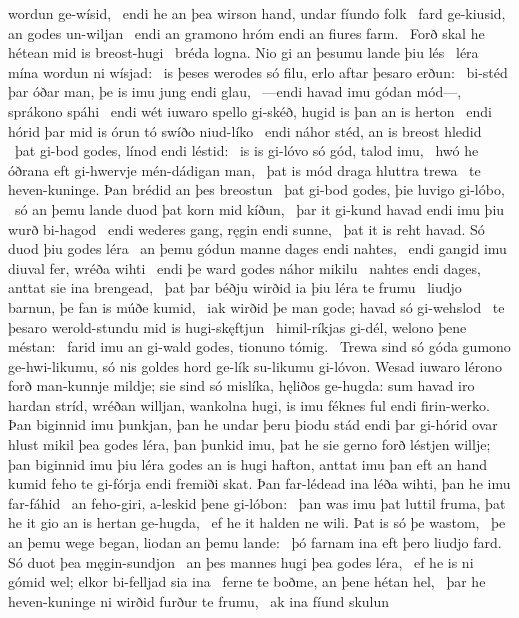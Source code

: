 wordun ge-wísid, \hld\ endi he an þea wirson hand,
undar fíundo folk \hld\ fard ge-kiusid,
an godes un-wiljan \hld\ endi an gramono hróm
endi an fiures farm. \hld\ Forð skal he hétean
mid is breost-hugi \hld\ bréda logna.
Nio gi an þesumu lande þiu lés \hld\ léra mína
wordun ni wísjad: \hld\ is þeses werodes só filu,
erlo aftar þesaro erðun: \hld\ bi-stéd þar óðar man,
þe is imu jung endi glau, \hld\ —endi havad imu gódan mód—,
sprákono spáhi \hld\ endi wét iuwaro spello gi-skéð,
hugid is þan an is herton \hld\ endi hórid þar mid is órun tó
swíðo niud-líko \hld\ endi náhor stéd,
an is breost hledid \hld\ þat gi-bod godes,
línod endi léstid: \hld\ is is gi-lóvo só gód,
talod imu, \hld\ hwó he óðrana eft gi-hwervje
mén-dádigan man, \hld\ þat is mód draga
hluttra trewa \hld\ te heven-kuninge.
Þan brédid an þes breostun \hld\ þat gi-bod godes,
þie luvigo gi-lóbo, \hld\ só an þemu lande duod
þat korn mid kíðun, \hld\ þar it gi-kund havad
endi imu þiu wurð bi-hagod \hld\ endi wederes gang,
ręgin endi sunne, \hld\ þat it is reht havad.
Só duod þiu godes léra \hld\ an þemu gódun manne
dages endi nahtes, \hld\ endi gangid imu diuval fer,
wréða wihti \hld\ endi þe ward godes
náhor mikilu \hld\ nahtes endi dages,
anttat sie ina brengead, \hld\ þat þar béðju wirðid
ia þiu léra te frumu \hld\ liudjo barnun,
þe fan is múðe kumid, \hld\ iak wirðid þe man gode;
havad só gi-wehslod \hld\ te þesaro werold-stundu
mid is hugi-skęftjun \hld\ himil-ríkjas gi-dél,
welono þene méstan: \hld\ farid imu an gi-wald godes,
tionuno tómig. \hld\ Trewa sind só góda
gumono ge-hwi-likumu, só nis goldes hord
ge-lík su-likumu gi-lóvon. Wesad iuwaro lérono forð
man-kunnje mildje; sie sind só mislíka,
hęliðos ge-hugda: sum havad iro hardan stríd,
wréðan willjan, wankolna hugi,
is imu féknes ful endi firin-werko.
Þan biginnid imu þunkjan, þan he undar þeru þiodu stád
endi þar gi-hórid ovar hlust mikil
þea godes léra, þan þunkid imu, þat he sie gerno forð
léstjen willje; þan biginnid imu þiu léra godes
an is hugi hafton, anttat imu þan eft an hand kumid
feho te gi-fórja endi fremiði skat.
Þan far-lédead ina léða wihti,
þan he imu far-fáhid \hld\ an feho-giri,
a-leskid þene gi-lóbon: \hld\ þan was imu þat luttil fruma,
þat he it gio an is hertan ge-hugda, \hld\ ef he it halden ne wili.
Þat is só þe wastom, \hld\ þe an þemu wege began,
liodan an þemu lande: \hld\ þó farnam ina eft þero liudjo fard.
Só duot þea męgin-sundjon \hld\ an þes mannes hugi
þea godes léra, \hld\ ef he is ni gómid wel;
elkor bi-felljad sia ina \hld\ ferne te boðme,
an þene hétan hel, \hld\ þar he heven-kuninge
ni wirðid furður te frumu, \hld\ ak ina fíund skulun
